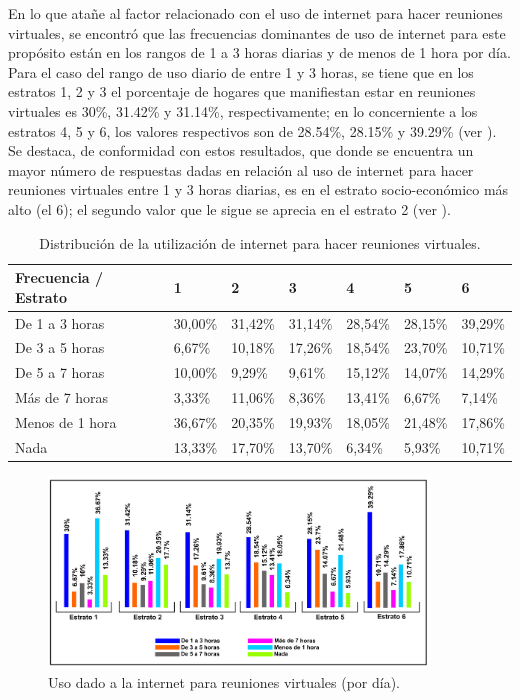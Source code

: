 \documentclass[spanish]{textolivre}
\begin{document}
En lo que atañe al factor relacionado con el uso de internet para hacer reuniones virtuales, se encontró que las frecuencias dominantes de uso de internet para este propósito están en los rangos de 1 a 3 horas diarias y de menos de 1 hora por día. Para el caso del rango de uso diario de entre 1 y 3 horas, se tiene que en los estratos 1, 2 y 3 el porcentaje de hogares que manifiestan estar en reuniones virtuales es 30\%, 31.42\% y 31.14\%, respectivamente; en lo concerniente a los estratos 4, 5 y 6, los valores respectivos son de 28.54\%, 28.15\% y 39.29\% (ver ). Se destaca, de conformidad con estos resultados, que donde se encuentra un mayor número de respuestas dadas en relación al uso de internet para hacer reuniones virtuales entre 1 y 3 horas diarias, es en el estrato socio-económico más alto (el 6); el segundo valor que le sigue se aprecia en el estrato 2 (ver ).

\begin{table}[htpb]
\caption{Distribución de la utilización de internet para hacer reuniones virtuales.}
\label{tab2}
\centering
\begin{tabular}{lllllll}
\toprule 
Frecuencia / Estrato & 1 & 2 & 3 & 4 & 5 & 6
\\ 
\midrule
De 1 a 3 horas & 30,00\% & 31,42\% & 31,14\% & 28,54\% & 28,15\% & 39,29\%
\\
De 3 a 5 horas & 6,67\% & 10,18\% & 17,26\% & 18,54\% & 23,70\% & 10,71\%
\\
De 5 a 7 horas & 10,00\% & 9,29\% & 9,61\% & 15,12\% & 14,07\% & 14,29\%
\\
Más de 7 horas & 3,33\% & 11,06\% & 8,36\% & 13,41\% & 6,67\% & 7,14\%
\\
Menos de 1 hora & 36,67\% & 20,35\% & 19,93\% & 18,05\% & 21,48\% & 17,86\%
\\
Nada & 13,33\% & 17,70\% & 13,70\% & 6,34\% & 5,93\% & 10,71\%
\\ 
\bottomrule
\end{tabular}
\end{table}

\begin{figure}[htbp]
 \centering
 \includegraphics[width=0.9\textwidth]{fig2.jpg}
 \caption{Uso dado a la internet para reuniones virtuales (por día).}
 \label{fig2}
\end{figure}
\end{document}
